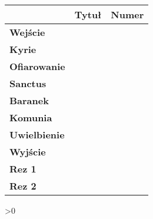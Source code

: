 \begin{changemargin}{0.2cm}{0.2cm} 	

\newcount\foo
{}
\loop
  \thispagestyle{empty} 
  \begin{tabular}{| p{2.5cm} || p{8.5cm} | p{1.5cm} |}
  		\hline 
  			 & \textbf{Tytuł} & \textbf{Numer}\\
  		\hline 
  			\textbf{Wejście} & & \\
  		\hline
  			\textbf{Kyrie} & & \\
  		\hline	
  			\textbf{Ofiarowanie} & & \\
  		\hline	
  			\textbf{Sanctus} & & \\
  		\hline	
  			\textbf{Baranek} & & \\
  		\hline
  			\textbf{Komunia} & & \\
  		\hline
  			\textbf{Uwielbienie} & & \\ 
  		\hline
  			\textbf{Wyjście} & & \\
  		\hline
  			\textbf{Rez 1} & & \\
  		\hline
  			\textbf{Rez 2} & & \\
  		\hline
	\end{tabular} 
  
  \advance {}
\ifnum \foo>0
\repeat
 
\end{changemargin}